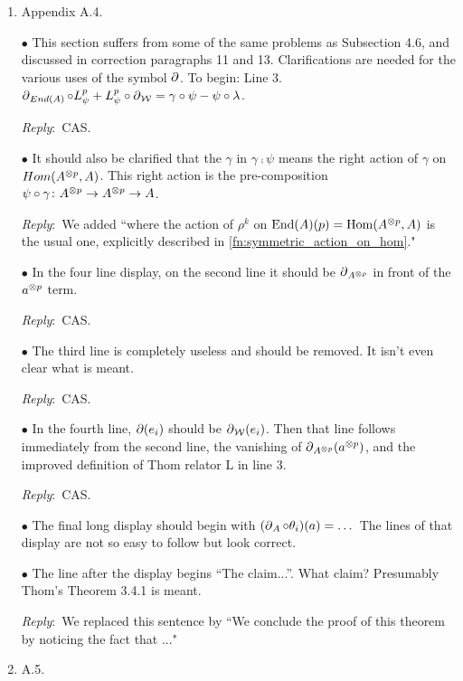 \documentclass{amsart}
\newcommand{\ar}{\medskip\noindent\textit{Reply}:\ }
\def\subitem{\medskip\noindent$\bullet$ }
\begin{document}
\begin{enumerate}
	\ar CAS.

	\subitem Clarify that $\sigma \in \sym_p$ and $\sym_p \supset \cyc_p \cong \Fp = {0, 1,\dots, p-1}$. Probably should include the computation $\rho^\gamma(q) = \gamma \rho(k^{-1}q) = \gamma(k^{-1} q + 1) = q + k = \rho^k(q)$.

	\ar CAS.

	\item Appendix A.4.

	\subitem This section suffers from some of the same problems as Subsection 4.6,
	and discussed in correction paragraphs 11 and 13.
	Clarifications are needed for the various
	uses of the symbol $\operatorname{\partial}$.
	To begin: Line 3. $\operatorname{\partial}_{End(A)} \mathbin{\circ} L^p_\psi + L^p_\psi \mathbin{\circ} \operatorname{\partial}_{\mathcal{W}} = \gamma \mathbin{\circ} \psi - \psi \mathbin{\circ} \lambda$.

	\ar CAS.

	\subitem It should also be clarified that the $\gamma$ in $\gamma \comp \psi$ means the right action of $\gamma$ on $Hom(A^{\otimes p} , A)$.
	This right action is the pre-composition $\psi \mathbin{\circ} \gamma \colon A^{\otimes p} \to A^{\otimes p} \to A$.

	\ar We added ``where the action of $\rho^k$ on $\mathrm{End}(A)(p) = \mathrm{Hom}(A^{\otimes p}, A)$ is the usual one, explicitly described in \cref{fn:symmetric_action_on_hom}."

	\subitem In the four line display, on the second line it should be $\operatorname{\partial}_{A^{\otimes p}}$ in front of the $a^{\otimes p}$ term.

	\ar CAS.

	\subitem The third line is completely useless and should be removed.
	It isn’t even clear what is meant.

	\ar CAS.

	\subitem In the fourth line, $\operatorname{\partial}(e_i)$ should be $\operatorname{\partial}_{\mathcal{W}}(e_i)$.
	Then that line follows immediately from the second line, the vanishing of $\operatorname{\partial}_{A^{\otimes p}}(a^{\otimes p})$, and the improved definition of Thom relator L in line 3.

	\ar CAS.

	\subitem The final long display should begin with $(\operatorname{\partial}_A \mathbin{\circ} \theta_i)(a) = \dots$ The lines of that display are not so easy to follow but look correct.

	\subitem The line after the display begins “The claim...”. What claim? Presumably Thom’s Theorem 3.4.1 is meant.

	\ar We replaced this sentence by ``We conclude the proof of this theorem by noticing the fact that ..."

	\item A.5.


\end{enumerate}
\end{document}
